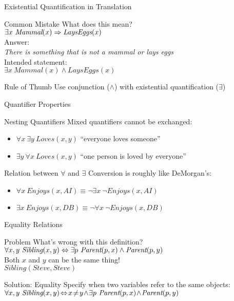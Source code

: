 \documentclass[14pt]{beamer}
\begin{document}
\begin{frame}{Existential Quantification in Translation}
	\begin{block}{Common Mistake}
		What does this mean? \\
		\tab$\exists x\ \textit{Mammal}(x) \Rightarrow \textit{LaysEggs}(x)$ \\
		\pause
		Answer: \\
		\tab\emph{There is something that is not a mammal or lays eggs} \\
		Intended statement: \\
		\tab$\exists x\ \textit{Mammal}(x) \land \textit{LaysEggs}(x)$ \\
	\end{block}
	\pause
	\begin{block}{Rule of Thumb}
		Use conjunction ($\land$) with existential quantification ($\exists$)
	\end{block}
\end{frame}
\begin{frame}{Quantifier Properties}
	\begin{block}{Nesting Quantifiers}
		Mixed quantifiers cannot be exchanged:
		\begin{itemize}
			\item $\forall x\ \exists y\ \textit{Loves}(x, y)$ ``everyone loves someone''
			\item $\exists y\ \forall x\ \textit{Loves}(x, y)$ ``one person is loved by everyone''
		\end{itemize}
	\end{block}
	\pause
	\begin{block}{Relation between $\forall$ and $\exists$}
		Conversion is roughly like DeMorgan's:
		\begin{itemize}
			\item $\forall x\ \textit{Enjoys}(x, \textit{AI}) \equiv \lnot\exists x\ \lnot \textit{Enjoys}(x, \textit{AI})$
			\item $\exists x\ \textit{Enjoys}(x, \textit{DB}) \equiv \lnot\forall x\ \lnot \textit{Enjoys}(x, \textit{DB})$
		\end{itemize}
	\end{block}
\end{frame}
\begin{frame}{Equality Relations}
	\begin{block}{Problem}
		What's wrong with this definition? \\
		\tab$\forall x, y\ \textit{Sibling}(x, y) \Leftrightarrow \exists p\ \textit{Parent}(p, x) \land \textit{Parent}(p, y)$ \\[1em]
		\pause
		Both $x$ and $y$ can be the same thing! \\
		\tab$\textit{Sibling}(\textit{Steve}, \textit{Steve})$
	\end{block}
	\pause
	\begin{block}{Solution: Equality}
		Specify when two variables refer to the same objects: \\[.5em]
		$\forall x, y\ \textit{Sibling}(x, y) \! \liff \! x \! \neq \! y \! \land \! \exists p\ \textit{Parent}(p, x) \! \land \! \textit{Parent}(p, y)$
	\end{block}
\end{frame}
\end{document}
